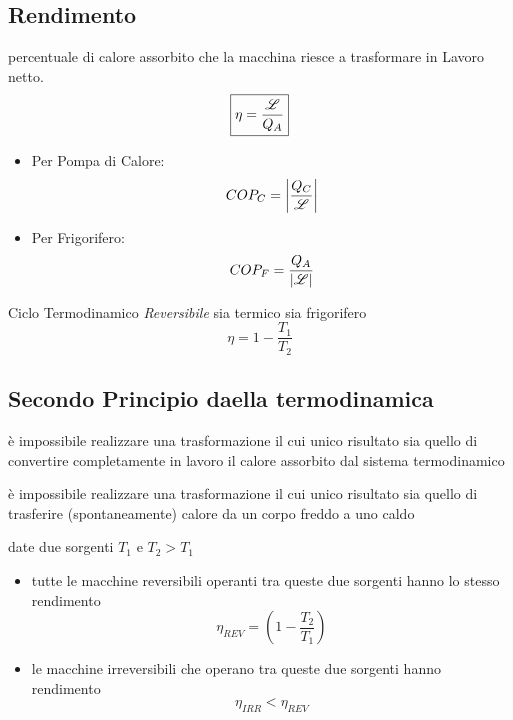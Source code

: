\subsection{Rendimento}
 percentuale di calore assorbito che la macchina riesce a trasformare in Lavoro netto.
\begin{equation}
    \boxed{\eta = \frac{\mathscr{L}}{Q_A}}
\end{equation}

\vspace{\baselineskip}
\begin{itemize}
    \item Per Pompa di Calore:
        \begin{equation}
            COP_C = \left | \frac{Q_C}{\mathscr{L}} \right |
        \end{equation}
    \item Per Frigorifero:
        \begin{equation}
            COP_F = \frac{Q_A}{|\mathscr{L}|}
        \end{equation}
\end{itemize}

 Ciclo Termodinamico \emph{Reversibile} sia termico sia frigorifero
\begin{equation}
    \eta = 1 - \frac{T_1}{T_2}
\end{equation}

\subsection{Secondo Principio daella termodinamica}
 è impossibile realizzare una trasformazione il cui unico risultato sia quello di convertire completamente in lavoro il calore assorbito dal sistema termodinamico

\vspace{\baselineskip}
 è impossibile realizzare una trasformazione il cui unico risultato sia quello di trasferire (spontaneamente) calore da un corpo freddo a uno caldo

\vspace{\baselineskip}
 date due sorgenti $T_1$ e $T_2 > T_1$
\begin{itemize}[leftmargin={130pt}]
    \item tutte le macchine reversibili operanti tra queste due sorgenti hanno lo stesso rendimento 
    \[
    \eta_{REV} = \left ( 1 - \frac{T_2}{T_1} \right )
    \]
    \item le macchine irreversibili che operano tra queste due sorgenti hanno rendimento
    \[
    \eta_{IRR} < \eta_{REV}
    \]
\end{itemize}

